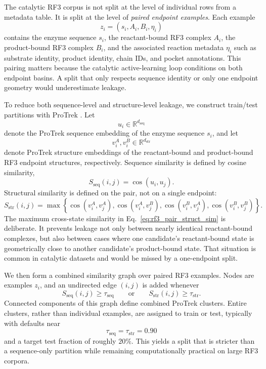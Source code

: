 \documentclass[11pt]{article}
\newcommand{\RR}{\mathbb{R}}
\begin{document}
	The catalytic RF3 corpus is not split at the level of individual rows from a metadata table. It is split at the level of \emph{paired endpoint examples}. Each example
	\begin{equation}
		z_i = (s_i, A_i, B_i, \eta_i)
	\end{equation}
	contains the enzyme sequence $s_i$, the reactant-bound RF3 complex $A_i$, the product-bound RF3 complex $B_i$, and the associated reaction metadata $\eta_i$ such as substrate identity, product identity, chain IDs, and pocket annotations. This pairing matters because the catalytic active-learning loop conditions on both endpoint basins. A split that only respects sequence identity or only one endpoint geometry would underestimate leakage.
	
	To reduce both sequence-level and structure-level leakage, we construct train/test partitions with ProTrek \citep{su2025trimodal}. Let
	\begin{equation}
		u_i \in \RR^{d_{\mathrm{seq}}}
	\end{equation}
	denote the ProTrek sequence embedding of the enzyme sequence $s_i$, and let
	\begin{equation}
		v_i^{A}, v_i^{B} \in \RR^{d_{\mathrm{str}}}
	\end{equation}
	denote ProTrek structure embeddings of the reactant-bound and product-bound RF3 endpoint structures, respectively. Sequence similarity is defined by cosine similarity,
	\begin{equation}
		S_{\mathrm{seq}}(i,j) = \cos(u_i,u_j).
	\end{equation}
	Structural similarity is defined on the pair, not on a single endpoint:
	\begin{equation}
		\label{eq:rf3_pair_struct_sim}
		S_{\mathrm{str}}(i,j)
		=
		\max
		\left\{
		\cos(v_i^{A},v_j^{A}),
		\cos(v_i^{A},v_j^{B}),
		\cos(v_i^{B},v_j^{A}),
		\cos(v_i^{B},v_j^{B})
		\right\}.
	\end{equation}
	The maximum cross-state similarity in Eq.~\eqref{eq:rf3_pair_struct_sim} is deliberate. It prevents leakage not only between nearly identical reactant-bound complexes, but also between cases where one candidate's reactant-bound state is geometrically close to another candidate's product-bound state. That situation is common in catalytic datasets and would be missed by a one-endpoint split.
	
	We then form a combined similarity graph over paired RF3 examples. Nodes are examples $z_i$, and an undirected edge $(i,j)$ is added whenever
	\begin{equation}
		S_{\mathrm{seq}}(i,j) \ge \tau_{\mathrm{seq}}
		\qquad\text{or}\qquad
		S_{\mathrm{str}}(i,j) \ge \tau_{\mathrm{str}}.
	\end{equation}
	Connected components of this graph define combined ProTrek clusters. Entire clusters, rather than individual examples, are assigned to train or test, typically with defaults near
	\begin{equation}
		\tau_{\mathrm{seq}} = \tau_{\mathrm{str}} = 0.90
	\end{equation}
	and a target test fraction of roughly $20\%$. This yields a split that is stricter than a sequence-only partition while remaining computationally practical on large RF3 corpora.
	
\end{document}
